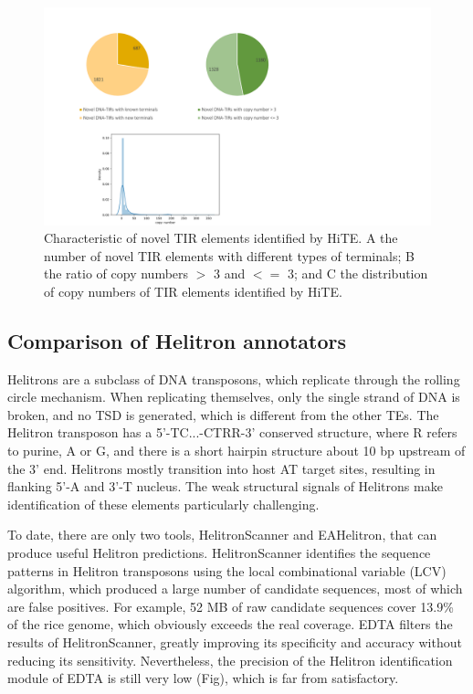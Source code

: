 \documentclass{bmcart}
\begin{document}
\begin{figure}[h!]
	\centerline{\includegraphics[width=1.0\textwidth]{figures/NovelTIRs.pdf}}
	\caption{Characteristic of novel TIR elements identified by HiTE. A the number of novel TIR elements with different types of terminals; B the ratio of copy numbers $>$ 3 and $<=$ 3; and C the distribution of copy numbers of TIR elements identified by HiTE.}
	\label{fig:novel_tirs}
\end{figure}

\subsection*{Comparison of Helitron annotators}
Helitrons are a subclass of DNA transposons, which replicate through the rolling circle mechanism. When replicating themselves, only the single strand of DNA is broken, and no TSD is generated, which is different from the other TEs. The Helitron transposon has a 5'-TC...-CTRR-3' conserved structure, where R refers to purine, A or G, and there is a short hairpin structure about 10 bp upstream of the 3' end. Helitrons mostly transition into host AT target sites, resulting in flanking 5'-A and 3'-T nucleus\cite{kapitonov2007helitrons}. The weak structural signals of Helitrons make identification of these elements particularly challenging.

To date, there are only two tools, HelitronScanner and EAHelitron, that can produce useful Helitron predictions. HelitronScanner\cite{xiong2014helitronscanner} identifies the sequence patterns in Helitron transposons using the local combinational variable (LCV) algorithm, which produced a large number of candidate sequences, most of which are false positives. For example, 52 MB of raw candidate sequences cover 13.9\% of the rice genome, which obviously exceeds the real coverage. EDTA filters the results of HelitronScanner, greatly improving its specificity and accuracy without reducing its sensitivity\cite{ou2019benchmarking}. Nevertheless, the precision of the Helitron identification module of EDTA is still very low (Fig), which is far from satisfactory.
\end{document}
